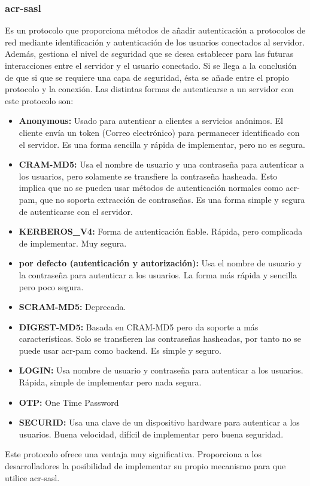 \documentclass[twoside, titlepage, 12pt, a4paper]{article}
\begin{document}
\subsubsection{\gls{acr-sasl}}
Es un protocolo que proporciona métodos de añadir autenticación a protocolos de red mediante identificación y autenticación de los usuarios conectados al servidor. Además, gestiona el nivel de seguridad que se desea establecer para las futuras interacciones entre el servidor y el usuario conectado. Si se llega a la conclusión de que si que se requiere una capa de seguridad, ésta se añade entre el propio protocolo y la conexión.\cite{rfc2222} 
Las distintas formas de autenticarse a un servidor con este protocolo son:
\begin{itemize}
	\item{\textbf{Anonymous: }}Usado para autenticar a clientes a servicios anónimos. El cliente envía un token (Correo electrónico) para permanecer identificado con el servidor. Es una forma sencilla y rápida de implementar, pero no es segura.
	\item{\textbf{CRAM-MD5: }}Usa el nombre de usuario y una contraseña para autenticar a los usuarios, pero solamente se transfiere la contraseña hasheada. Esto implica que no se pueden usar métodos de autenticación normales como \gls{acr-pam}, que no soporta extracción de contraseñas. Es una forma simple y segura de autenticarse con el servidor.
	\item{\textbf{KERBEROS\_V4: }}Forma de autenticación fiable. Rápida, pero complicada de implementar. Muy segura.
	\item{\textbf{por defecto (autenticación y autorización): }}Usa el nombre de usuario y la contraseña para autenticar a los usuarios. La forma más rápida y sencilla pero poco segura.
	\item{\textbf{SCRAM-MD5: }}Deprecada.
	\item{\textbf{DIGEST-MD5: }}Basada en CRAM-MD5 pero da soporte a más características. Solo se transfieren las contraseñas hasheadas, por tanto no se puede usar \gls{acr-pam} como backend. Es simple y seguro.
	\item{\textbf{LOGIN: }}Usa nombre de usuario y contraseña para autenticar a los usuarios. Rápida, simple de implementar pero nada segura.
	\item{\textbf{OTP: }}One Time Password
	\item{\textbf{SECURID: }}Usa una clave de un dispositivo hardware para autenticar a los usuarios. Buena velocidad, difícil de implementar pero buena seguridad.
\end{itemize}
Este protocolo ofrece una ventaja muy significativa. Proporciona a los desarrolladores la posibilidad de implementar su propio mecanismo para que utilice \gls{acr-sasl}.
\end{document}
